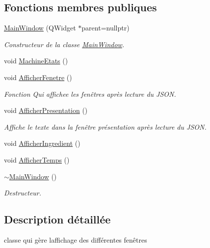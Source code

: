 \subsection*{Fonctions membres publiques}
\begin{DoxyCompactItemize}
\item 
\hyperlink{class_main_window_a996c5a2b6f77944776856f08ec30858d}{Main\+Window} (Q\+Widget $\ast$parent=nullptr)
\begin{DoxyCompactList}\small\item\em Constructeur de la classe \hyperlink{class_main_window}{Main\+Window}. \end{DoxyCompactList}\item 
void \hyperlink{class_main_window_a59cd9a83e43405ae1ad5c18e79b04db5}{Machine\+Etats} ()
\item 
void \hyperlink{class_main_window_a7f4b9726171670ec8d85bb6b09e0665d}{Afficher\+Fenetre} ()
\begin{DoxyCompactList}\small\item\em Fonction Qui affichee les fenêtres après lecture du J\+S\+ON. \end{DoxyCompactList}\item 
void \hyperlink{class_main_window_a9bf06dfcc398454facb39e71ebf32550}{Afficher\+Presentation} ()
\begin{DoxyCompactList}\small\item\em Affiche le texte dans la fenêtre présentation après lecture du J\+S\+ON. \end{DoxyCompactList}\item 
void \hyperlink{class_main_window_ad4059abf16eb904f988371b3791002bf}{Afficher\+Ingredient} ()
\item 
void \hyperlink{class_main_window_a33811a52abf8f1ce71ec4e150d9c9ac8}{Afficher\+Temps} ()
\item 
\hyperlink{class_main_window_ae98d00a93bc118200eeef9f9bba1dba7}{$\sim$\+Main\+Window} ()
\begin{DoxyCompactList}\small\item\em Destructeur. \end{DoxyCompactList}\end{DoxyCompactItemize}


\subsection{Description détaillée}
classe qui gère l\textquotesingle{}affichage des différentes fenêtres 


